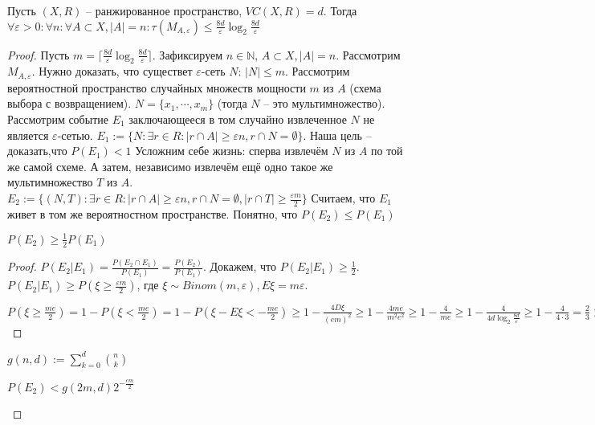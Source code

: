 \documentclass[document.tex]{subfiles}
\begin{document}
\begin{theorem}
    Пусть $(X, R)$ -- ранжированное пространство, $VC(X, R) = d$. Тогда $\forall \varepsilon > 0: \forall n: \forall A
    \subset X, |A| = n: \tau(M_{A, \varepsilon}) \leq \frac{8d}{\varepsilon} \log_2 \frac{8d}{\varepsilon}$
\end{theorem}

\begin{proof}
    Пусть $m = \lceil \frac{8d}{\varepsilon} \log_2 \frac{8d}{\varepsilon} \rceil$. Зафиксируем $n \in \mathbb{N}$,
$A \subset X, |A| = n$. Рассмотрим $M_{A, \varepsilon}$. Нужно доказать, что существет $\varepsilon$-сеть $N$: $|N|
\leq m$. Рассмотрим вероятностной пространство случайных множеств мощности $m$ из $A$ (схема выбора с возвращением). 
$N = \{x_1, \cdots, x_m\}$ (тогда $N$ -- это мультимножество). Рассмотрим событие $E_1$ заключающееся в том случайно
извлеченное $N$ не является $\varepsilon$-сетью.
$E_1 := \{N : \exists r \in R: |r \cap A| \geq \varepsilon n, r \cap N = \emptyset \}$. Наша цель -- доказать,что
$P(E_1) < 1$
Усложним себе жизнь: сперва извлечём $N$ из $A$ по той же самой схеме. А затем, независимо извлечём ещё одно такое же
мультимножество $T$ из $A$.
$E_2 := \{(N, T): \exists r \in R: |r \cap A| \geq \varepsilon n, r \cap N = \emptyset, |r \cap T| \geq
    \frac{\varepsilon m}{2} \}$
Считаем, что $E_1$ живет в том же вероятностном пространстве.
Понятно, что $P(E_2) \leq P(E_1)$
\begin{lemma}
    $P(E_2) \geq \frac{1}{2}P(E_1)$
\end{lemma}
\begin{proof}
    $P(E_2|E_1) = \frac{P(E_2 \cap E_1)}{P(E_1)} =\frac{P(E_2)}{P(E_1)}$. Докажем, что $P(E_2|E_1) \geq
    \frac{1}{2}$. 
    $P(E_2 | E_1) \geq P(\xi \geq \frac{\varepsilon m}{2})$, где $\xi \sim Binom(m, \varepsilon), E\xi = m \varepsilon$.

    $P(\xi \geq \frac{me}{2}) = 1 - P(\xi < \frac{me}{2}) = 1 - P(\xi - E\xi < -\frac{me}{2}) \geq 1 -
    \frac{4D \xi}{(em)^2} \geq 1 - \frac{4me}{m^2e^2} \geq 1 - \frac{4}{me} \geq 1 - \frac{4}{4d \log_2
        \frac{8d}{\varepsilon}} \geq 1 - \frac{4}{4 \cdot 3} = \frac{2}{3} > \frac{1}{2}$
\end{proof}
$g(n, d) := \sum_{k = 0}^{d} \binom{n}{k}$
\begin{lemma}
    $P(E_2) < g(2m, d) 2^{-\frac{em}{2}}$
\end{lemma}


\end{proof}
\end{document}
